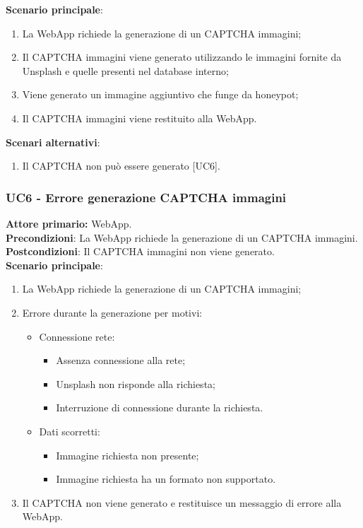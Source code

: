 \textbf{Scenario principale}:
\begin{enumerate}
    \item La WebApp richiede la generazione di un CAPTCHA immagini;
    \item Il CAPTCHA immagini viene generato utilizzando le immagini fornite da Unsplash e quelle presenti nel database interno;
    \item Viene generato un immagine aggiuntivo che funge da honeypot;
    \item Il CAPTCHA immagini viene restituito alla WebApp.
\end{enumerate}
\textbf{Scenari alternativi}:
\begin{enumerate}
    \item Il CAPTCHA non può essere generato [UC6].
\end{enumerate}

\subsubsection{UC6 - Errore generazione CAPTCHA immagini}
\textbf{Attore primario:} WebApp.\\
\textbf{Precondizioni}: La WebApp richiede la generazione di un CAPTCHA immagini.\\
\textbf{Postcondizioni}: Il CAPTCHA immagini non viene generato.\\

\textbf{Scenario principale}:
\begin{enumerate}
    \item La WebApp richiede la generazione di un CAPTCHA immagini;
    \item Errore durante la generazione per motivi:
		\begin{itemize}
    		\item Connessione rete:
			\begin{itemize}
	    		\item Assenza connessione alla rete;
	    		\item Unsplash non risponde alla richiesta;
			\item Interruzione di connessione durante la richiesta.
			\end{itemize}
    		\item Dati scorretti:
			\begin{itemize}
	    		\item Immagine richiesta non presente;
	    		\item Immagine richiesta ha un formato non supportato.
			\end{itemize}
		\end{itemize}
    \item Il CAPTCHA non viene generato e restituisce un messaggio di errore alla WebApp.\\
\end{enumerate}

